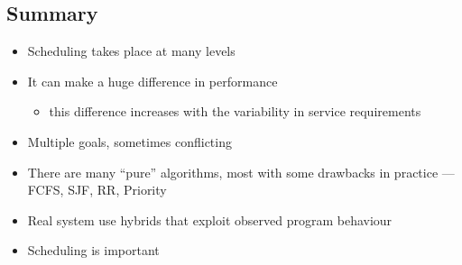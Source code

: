 \documentclass[11pt,a4paper]{article}
\begin{document}
\subsection{Summary}
\begin{itemize}
    \item Scheduling takes place at many levels
    \item It can make a huge difference in performance
        \begin{itemize}
            \item this difference increases with the variability in service requirements
        \end{itemize}
    \item Multiple goals, sometimes conflicting
    \item There are many ``pure'' algorithms, most with some drawbacks in practice ---
        FCFS, SJF, RR, Priority
    \item Real system use hybrids that exploit observed program behaviour
    \item Scheduling is important
\end{itemize}
\end{document}
